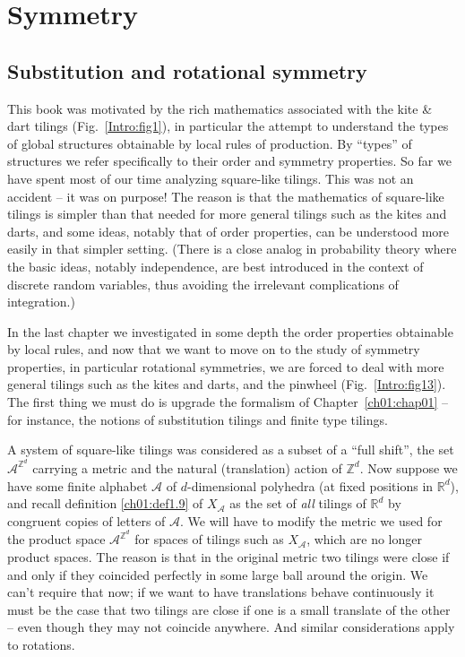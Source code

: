 \documentclass[reqno]{stml-l}
\theoremstyle{plain}
\theoremstyle{definition}
\numberwithin{equation}{chapter}
\begin{document}
\chapter{Symmetry}\label{ch04:chap04}

\section{Substitution and rotational symmetry}\label{ch04:sec1}

This book was motivated by the rich mathematics associated with the kite \& dart tilings (Fig.~\ref{Intro:fig1}), in particular the attempt to understand the types of global structures obtainable by local rules of production. By ``types'' of structures we refer specifically to their order and symmetry properties. So far we have spent most of our time analyzing square-like tilings. This was not an accident -- it was on purpose! The reason is that the mathematics of square-like tilings is simpler than that needed for more general tilings such as the kites and darts, and some ideas, notably that of order properties, can be understood more easily in that simpler setting. (There is a close analog in probability theory where the basic ideas, notably independence, are best introduced in the context of discrete random variables, thus avoiding the irrelevant complications of integration.)

In the last chapter we investigated in some depth the order properties obtainable by local rules, and now that we want to move on to the study of symmetry properties, in particular rotational symmetries, we are forced to deal with more general tilings such as the kites and darts, and the pinwheel (Fig.~\ref{Intro:fig13}). The first thing we must do is upgrade the formalism of Chapter~\ref{ch01:chap01} -- for instance, the notions of substitution tilings and finite type tilings.

A system of square-like tilings was considered as a subset of a ``full shift'', the set $\mathcal{A}^{\mathbb{Z}^{d}}$ carrying a metric and the natural (translation) action of $\mathbb{Z}^{d}$. Now suppose we have some finite alphabet $\mathcal{A}$ of $d$-dimensional polyhedra (at fixed positions in $\mathbb{R}^{d}$), and recall definition \ref{ch01:def1.9} of $X_{\mathcal{A}}$ as the set of \emph{all} tilings of $\mathbb{R}^{d}$ by congruent copies of letters of $\mathcal{A}$. We will have to modify the metric we used for the product space $\mathcal{A}^{\mathbb{Z}^{d}}$ for spaces of tilings such as $X_{\mathcal{A}}$, which are no longer product spaces. The reason is that in the original metric two tilings were close if and only if they coincided perfectly in some large ball around the origin. We can't require that now; if we want to have translations behave continuously it must be the case that two tilings are close if one is a small translate of the other -- even though they may not coincide anywhere. And similar considerations apply to rotations.
\end{document}

